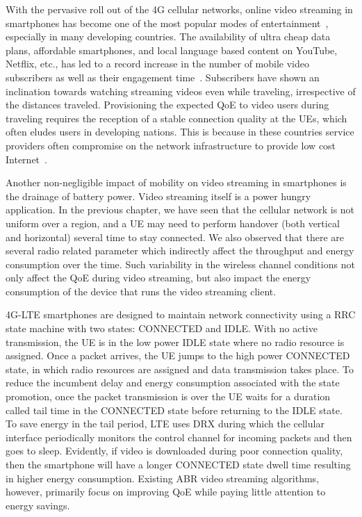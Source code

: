 With the pervasive roll out of the \ac{4G} cellular networks, online video streaming in smartphones has become one of the most popular modes of entertainment~\cite{CISCO2019}, especially in many developing countries. The availability of ultra cheap data plans, affordable smartphones, and local
language based content on YouTube, Netflix, etc., has led to a record increase in the number of mobile video subscribers as well as their engagement time~\cite{Mobstat_2019}. Subscribers have shown an inclination towards watching streaming videos even while traveling, irrespective of the distances traveled. Provisioning the expected \ac{QoE} to video users during traveling requires the reception of a stable connection quality at the \acp{UE}, which often eludes users in developing nations. This is because in these countries service providers often compromise on the network infrastructure to provide low cost Internet~\cite{Poor_Inf_2019_2}. 

Another non-negligible impact of mobility on video streaming in smartphones is the drainage of battery power. Video streaming itself is a power hungry application. In the previous chapter, we have seen that the cellular network is not uniform over a region, and a \ac{UE} may need to perform handover (both vertical and horizontal) several time to stay connected. We also observed that there are several radio related parameter which indirectly affect the throughput and energy consumption over the time. Such variability in the wireless channel conditions not only affect the \ac{QoE} during video streaming, but also impact the energy consumption of the device that runs the video streaming client. 

\ac{4G}-\ac{LTE} smartphones are designed to maintain network connectivity using a \ac{RRC} state machine with two states: CONNECTED and IDLE. With
no active transmission, the \ac{UE} is in the low power IDLE state where no radio resource is assigned. Once a packet arrives, the \ac{UE} jumps to the high power CONNECTED state, in which radio resources are assigned and data transmission
takes place. To reduce the incumbent delay and energy consumption associated with the state promotion, once the packet transmission is over the \ac{UE} waits for a duration called tail time in the CONNECTED state before returning to the IDLE state. To save energy in the tail period, \ac{LTE} uses \ac{DRX} during which the cellular interface periodically monitors the control channel for incoming packets and then goes to sleep. Evidently, if video is downloaded during poor connection quality, then the smartphone will have a longer CONNECTED state dwell time resulting in higher energy consumption. Existing \ac{ABR} video streaming algorithms, however, primarily focus on improving \ac{QoE} while paying little attention to energy savings.

